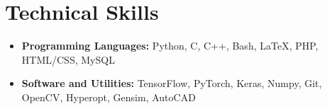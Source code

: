 \section*{Technical Skills}
\begin{itemize}

\setlength\itemsep{0pt}
\item \textbf{Programming Languages:} Python, C, C++, Bash, \LaTeX, PHP, HTML/CSS, MySQL
\item \textbf{Software and Utilities:} TensorFlow, PyTorch, Keras, Numpy, Git, OpenCV, Hyperopt, Gensim, AutoCAD

\end{itemize}
